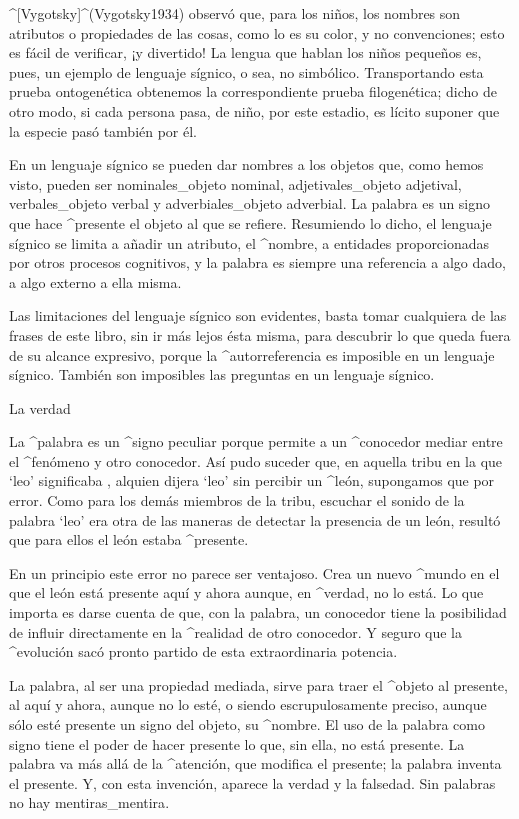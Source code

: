 ^[Vygotsky]^(Vygotsky1934) observó que, para los niños, los nombres son
atributos o propiedades de las cosas, como lo es su color, y no
convenciones; esto es fácil de verificar, ¡y divertido! La lengua que
hablan los niños pequeños es, pues, un ejemplo de lenguaje sígnico, o
sea, no simbólico. Transportando esta prueba ontogenética obtenemos la
correspondiente prueba filogenética; dicho de otro modo, si cada persona
pasa, de niño, por este estadio, es lícito suponer que la especie pasó
también por él.

En un lenguaje sígnico se pueden dar nombres a los objetos que, como
hemos visto, pueden ser nominales_{objeto nominal}, adjetivales_{objeto
adjetival}, verbales_{objeto verbal} y adverbiales_{objeto adverbial}.
La palabra es un signo que hace ^{presente} el objeto al que se refiere.
Resumiendo lo dicho, el lenguaje sígnico se limita a añadir un atributo,
el ^{nombre}, a entidades proporcionadas por otros procesos cognitivos,
y la palabra es siempre una referencia a algo dado, a algo externo a
ella misma.

Las limitaciones del lenguaje sígnico son evidentes, basta tomar
cualquiera de las frases de este libro, sin ir más lejos ésta misma,
para descubrir lo que queda fuera de su alcance expresivo, porque la
^{autorreferencia} es imposible en un lenguaje sígnico. También son
imposibles las preguntas en un lenguaje sígnico.


\Section La verdad

La ^{palabra} es un ^{signo} peculiar porque permite a un ^{conocedor}
mediar entre el ^{fenómeno} y otro conocedor. Así pudo suceder que, en
aquella tribu en la que `leo' significaba , alquien dijera
`leo' sin percibir un ^{león}, supongamos que por error. Como para los
demás miembros de la tribu, escuchar el sonido de la palabra `leo' era
otra de las maneras de detectar la presencia de un león, resultó que
para ellos el león estaba ^{presente}.

En un principio este error no parece ser ventajoso. Crea un nuevo
^{mundo} en el que el león está presente aquí y ahora aunque, en
^{verdad}, no lo está. Lo que importa es darse cuenta de que, con la
palabra, un conocedor tiene la posibilidad de influir directamente en la
^{realidad} de otro conocedor. Y seguro que la ^{evolución} sacó pronto
partido de esta extraordinaria potencia.

La palabra, al ser una propiedad mediada, sirve para traer el ^{objeto}
al presente, al aquí y ahora, aunque no lo esté, o siendo
escrupulosamente preciso, aunque sólo esté presente un signo del objeto,
su ^{nombre}. El uso de la palabra como signo tiene el poder de hacer
presente lo que, sin ella, no está presente. La palabra va más allá de
la ^{atención}, que modifica el presente; la palabra inventa el
presente. Y, con esta invención, aparece la verdad y la falsedad. Sin
palabras no hay mentiras_{mentira}.


